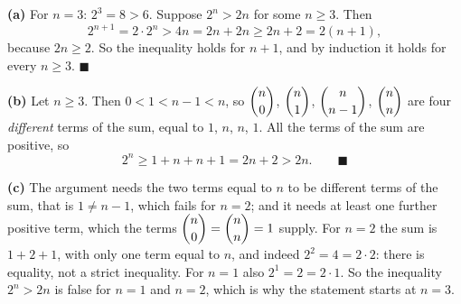 \textbf{(a)} For $n=3$: $2^3=8>6$. Suppose $2^n>2n$ for some $n\ge3$. Then
\[2^{n+1}=2\cdot2^n>4n=2n+2n\ge2n+2=2(n+1),\]
because $2n\ge2$. So the inequality holds for $n+1$, and by induction it holds for every $n\ge3$. $\blacksquare$

\textbf{(b)} Let $n\ge3$. Then $0<1<n-1<n$, so $\dbinom n0$, $\dbinom n1$, $\dbinom n{n-1}$, $\dbinom nn$ are four \emph{different} terms of the sum, equal to $1$, $n$, $n$, $1$. All the terms of the sum are positive, so
\[2^n\ge1+n+n+1=2n+2>2n.\qquad\blacksquare\]

\textbf{(c)} The argument needs the two terms equal to $n$ to be different terms of the sum, that is $1\ne n-1$, which fails for $n=2$; and it needs at least one further positive term, which the terms $\dbinom n0=\dbinom nn=1$ supply. For $n=2$ the sum is $1+2+1$, with only one term equal to $n$, and indeed $2^2=4=2\cdot2$: there is equality, not a strict inequality. For $n=1$ also $2^1=2=2\cdot1$. So the inequality $2^n>2n$ is false for $n=1$ and $n=2$, which is why the statement starts at $n=3$.

